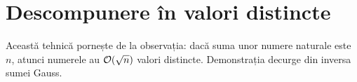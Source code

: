 \documentclass[../main.tex]{subfiles}
\begin{document}
\section{Descompunere în valori distincte}

Această tehnică pornește de la observația: dacă suma unor numere naturale este $n$, atunci numerele au $\mathcal{O}(\sqrt{n})$ valori distincte. Demonstrația decurge din inversa sumei Gauss.
\end{document}
